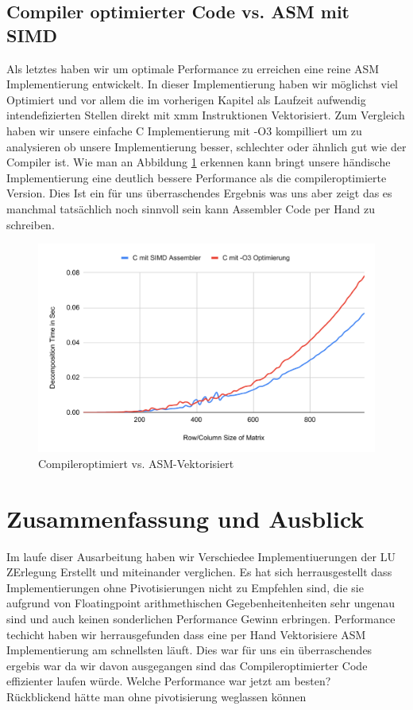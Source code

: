 \documentclass[course=erap]{aspdoc}
\begin{document}
 \subsection{Compiler optimierter Code vs. ASM mit SIMD}
Als letztes haben wir um optimale Performance zu erreichen eine reine ASM Implementierung entwickelt. In dieser Implementierung haben wir möglichst viel Optimiert und vor allem die im vorherigen Kapitel als Laufzeit aufwendig
 intendefizierten Stellen direkt mit xmm Instruktionen Vektorisiert. Zum Vergleich haben wir unsere einfache C Implementierung mit -O3 kompilliert um zu analysieren ob unsere Implementierung besser, schlechter oder ähnlich gut wie der Compiler ist.
 Wie man an Abbildung \ref{CvsASM} erkennen kann bringt unsere händische Implementierung eine deutlich bessere Performance als die compileroptimierte Version. Dies Ist ein für uns überraschendes Ergebnis was uns aber zeigt das 
 es manchmal tatsächlich noch sinnvoll sein kann Assembler Code per Hand zu schreiben.

 \begin{figure}[H]
 \begin{center}
 \caption{Compileroptimiert vs. ASM-Vektorisiert} 
  \label{CvsASM}
 \includegraphics[width = 0.8\linewidth]{CvsASM.pdf}

 
 \end{center}
\end{figure}



\section{Zusammenfassung und Ausblick}
Im laufe diser Ausarbeitung haben wir Verschiedee Implementiuerungen der LU ZErlegung Erstellt und miteinander verglichen. Es hat sich herrausgestellt dass Implementierungen ohne Pivotisierungen nicht zu Empfehlen sind,
die sie aufgrund von Floatingpoint arithmethischen Gegebenheitenheiten sehr ungenau sind und auch keinen sonderlichen Performance Gewinn erbringen. Performance techicht haben wir herrausgefunden dass eine per Hand Vektorisiere ASM Implementierung am 
schnellsten läuft. Dies war für uns ein überraschendes ergebis war da wir davon ausgegangen sind das Compileroptimierter Code effizienter laufen würde.   
Welche Performance war jetzt am besten?\\
Rückblickend hätte man ohne pivotisierung weglassen können\\

{}
\end{document}
